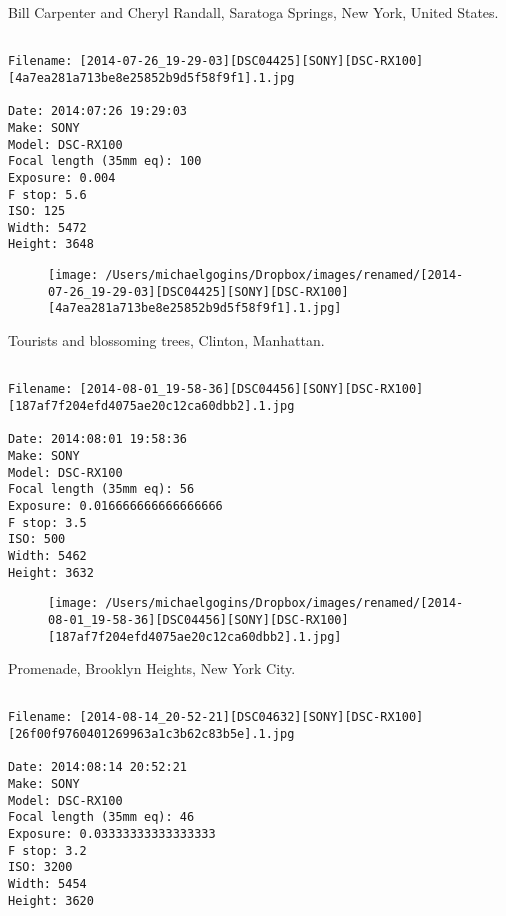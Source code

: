 \documentclass[11pt,letter,DIV=14,paper=landscape]{scrbook}
\begin{document}
\clearpage
\noindent Bill Carpenter and Cheryl Randall, Saratoga Springs, New York, United States.
\noindent
\begin{lstlisting}

Filename: [2014-07-26_19-29-03][DSC04425][SONY][DSC-RX100][4a7ea281a713be8e25852b9d5f58f9f1].1.jpg

Date: 2014:07:26 19:29:03
Make: SONY
Model: DSC-RX100
Focal length (35mm eq): 100
Exposure: 0.004
F stop: 5.6
ISO: 125
Width: 5472
Height: 3648
\end{lstlisting}
\clearpage

\begin{figure}
\texttt{[image: /Users/michaelgogins/Dropbox/images/renamed/[2014-07-26\_19-29-03][DSC04425][SONY][DSC-RX100][4a7ea281a713be8e25852b9d5f58f9f1].1.jpg]}
\end{figure}
    
\clearpage
\noindent Tourists and blossoming trees, Clinton, Manhattan.
\noindent
\begin{lstlisting}

Filename: [2014-08-01_19-58-36][DSC04456][SONY][DSC-RX100][187af7f204efd4075ae20c12ca60dbb2].1.jpg

Date: 2014:08:01 19:58:36
Make: SONY
Model: DSC-RX100
Focal length (35mm eq): 56
Exposure: 0.016666666666666666
F stop: 3.5
ISO: 500
Width: 5462
Height: 3632
\end{lstlisting}
\clearpage

\begin{figure}
\texttt{[image: /Users/michaelgogins/Dropbox/images/renamed/[2014-08-01\_19-58-36][DSC04456][SONY][DSC-RX100][187af7f204efd4075ae20c12ca60dbb2].1.jpg]}
\end{figure}
    
\clearpage
\noindent Promenade, Brooklyn Heights, New York City.
\noindent
\begin{lstlisting}

Filename: [2014-08-14_20-52-21][DSC04632][SONY][DSC-RX100][26f00f9760401269963a1c3b62c83b5e].1.jpg

Date: 2014:08:14 20:52:21
Make: SONY
Model: DSC-RX100
Focal length (35mm eq): 46
Exposure: 0.03333333333333333
F stop: 3.2
ISO: 3200
Width: 5454
Height: 3620
\end{lstlisting}
\clearpage
\end{document}
